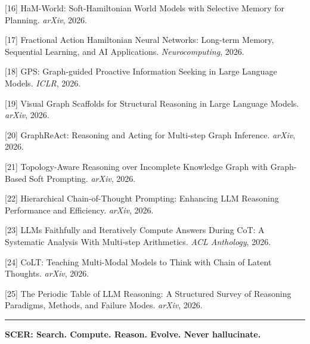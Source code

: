 \documentclass[
  11pt,
  a4paper,
]{article}
\begin{document}
{[}16{]} HaM-World: Soft-Hamiltonian World Models with Selective Memory
for Planning. \emph{arXiv}, 2026.

{[}17{]} Fractional Action Hamiltonian Neural Networks: Long-term
Memory, Sequential Learning, and AI Applications. \emph{Neurocomputing},
2026.

{[}18{]} GPS: Graph-guided Proactive Information Seeking in Large
Language Models. \emph{ICLR}, 2026.

{[}19{]} Visual Graph Scaffolds for Structural Reasoning in Large
Language Models. \emph{arXiv}, 2026.

{[}20{]} GraphReAct: Reasoning and Acting for Multi-step Graph
Inference. \emph{arXiv}, 2026.

{[}21{]} Topology-Aware Reasoning over Incomplete Knowledge Graph with
Graph-Based Soft Prompting. \emph{arXiv}, 2026.

{[}22{]} Hierarchical Chain-of-Thought Prompting: Enhancing LLM
Reasoning Performance and Efficiency. \emph{arXiv}, 2026.

{[}23{]} LLMs Faithfully and Iteratively Compute Answers During CoT: A
Systematic Analysis With Multi-step Arithmetics. \emph{ACL Anthology},
2026.

{[}24{]} CoLT: Teaching Multi-Modal Models to Think with Chain of Latent
Thoughts. \emph{arXiv}, 2026.

{[}25{]} The Periodic Table of LLM Reasoning: A Structured Survey of
Reasoning Paradigms, Methods, and Failure Modes. \emph{arXiv}, 2026.

\begin{center}\rule{0.5\linewidth}{0.5pt}\end{center}

\textbf{SCER: Search. Compute. Reason. Evolve. Never hallucinate.}
\end{document}
